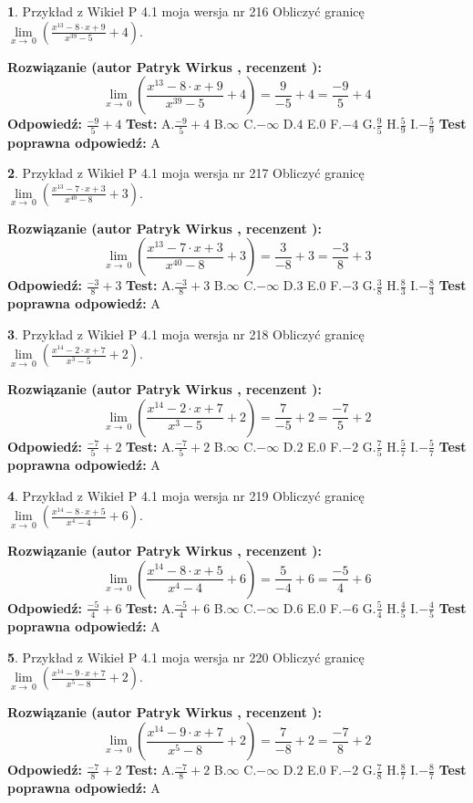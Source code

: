 \documentclass[12pt, a4paper]{article}
\theoremstyle{definition} %
\newtheorem{zad}{}
\newcommand{\zadStart}[1]{\begin{zad}#1\newline}
\newcommand{\zadStop}{\end{zad}}
\newcommand{\rozwStart}[2]{\noindent \textbf{Rozwiązanie (autor #1 , recenzent #2): }\newline}
\newcommand{\rozwStop}{\newline}
\newcommand{\odpStart}{\noindent \textbf{Odpowiedź:}\newline}
\newcommand{\odpStop}{\newline}
\newcommand{\testStart}{\noindent \textbf{Test:}\newline}
\newcommand{\testStop}{\newline}
\newcommand{\kluczStart}{\noindent \textbf{Test poprawna odpowiedź:}\newline}
\newcommand{\kluczStop}{\newline}
\begin{document}
\zadStart{Przykład z Wikieł P 4.1 moja wersja nr 216}
Obliczyć granicę $\lim\limits_{x\to\ 0}(\frac{x^{13}-8 \cdot x +9}{x^{39}-5}+4)$.
\zadStop
\rozwStart{Patryk Wirkus}{}
$$\lim\limits_{x\to\ 0}(\frac{x^{13}-8 \cdot x +9}{x^{39}-5}+4)=\frac{9}{-5}+4=\frac{-9}{5}+4$$
\rozwStop
\odpStart
$\frac{-9}{5}+4$
\odpStop
\testStart
A.$\frac{-9}{5}+4$
B.$\infty$
C.$-\infty$
D.$4$
E.$0$
F.$-4$
G.$\frac{9}{5}$
H.$\frac{5}{9}$
I.$-\frac{5}{9}$
\testStop
\kluczStart
A
\kluczStop



\zadStart{Przykład z Wikieł P 4.1 moja wersja nr 217}
Obliczyć granicę $\lim\limits_{x\to\ 0}(\frac{x^{13}-7 \cdot x +3}{x^{40}-8}+3)$.
\zadStop
\rozwStart{Patryk Wirkus}{}
$$\lim\limits_{x\to\ 0}(\frac{x^{13}-7 \cdot x +3}{x^{40}-8}+3)=\frac{3}{-8}+3=\frac{-3}{8}+3$$
\rozwStop
\odpStart
$\frac{-3}{8}+3$
\odpStop
\testStart
A.$\frac{-3}{8}+3$
B.$\infty$
C.$-\infty$
D.$3$
E.$0$
F.$-3$
G.$\frac{3}{8}$
H.$\frac{8}{3}$
I.$-\frac{8}{3}$
\testStop
\kluczStart
A
\kluczStop



\zadStart{Przykład z Wikieł P 4.1 moja wersja nr 218}
Obliczyć granicę $\lim\limits_{x\to\ 0}(\frac{x^{14}-2 \cdot x +7}{x^{3}-5}+2)$.
\zadStop
\rozwStart{Patryk Wirkus}{}
$$\lim\limits_{x\to\ 0}(\frac{x^{14}-2 \cdot x +7}{x^{3}-5}+2)=\frac{7}{-5}+2=\frac{-7}{5}+2$$
\rozwStop
\odpStart
$\frac{-7}{5}+2$
\odpStop
\testStart
A.$\frac{-7}{5}+2$
B.$\infty$
C.$-\infty$
D.$2$
E.$0$
F.$-2$
G.$\frac{7}{5}$
H.$\frac{5}{7}$
I.$-\frac{5}{7}$
\testStop
\kluczStart
A
\kluczStop



\zadStart{Przykład z Wikieł P 4.1 moja wersja nr 219}
Obliczyć granicę $\lim\limits_{x\to\ 0}(\frac{x^{14}-8 \cdot x +5}{x^{4}-4}+6)$.
\zadStop
\rozwStart{Patryk Wirkus}{}
$$\lim\limits_{x\to\ 0}(\frac{x^{14}-8 \cdot x +5}{x^{4}-4}+6)=\frac{5}{-4}+6=\frac{-5}{4}+6$$
\rozwStop
\odpStart
$\frac{-5}{4}+6$
\odpStop
\testStart
A.$\frac{-5}{4}+6$
B.$\infty$
C.$-\infty$
D.$6$
E.$0$
F.$-6$
G.$\frac{5}{4}$
H.$\frac{4}{5}$
I.$-\frac{4}{5}$
\testStop
\kluczStart
A
\kluczStop



\zadStart{Przykład z Wikieł P 4.1 moja wersja nr 220}
Obliczyć granicę $\lim\limits_{x\to\ 0}(\frac{x^{14}-9 \cdot x +7}{x^{5}-8}+2)$.
\zadStop
\rozwStart{Patryk Wirkus}{}
$$\lim\limits_{x\to\ 0}(\frac{x^{14}-9 \cdot x +7}{x^{5}-8}+2)=\frac{7}{-8}+2=\frac{-7}{8}+2$$
\rozwStop
\odpStart
$\frac{-7}{8}+2$
\odpStop
\testStart
A.$\frac{-7}{8}+2$
B.$\infty$
C.$-\infty$
D.$2$
E.$0$
F.$-2$
G.$\frac{7}{8}$
H.$\frac{8}{7}$
I.$-\frac{8}{7}$
\testStop
\kluczStart
A
\kluczStop
\end{document}
